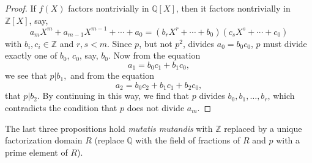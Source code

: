 \documentclass[a4paper,11pt,final,openany]{memoir}
\theoremstyle{nonumberplain}
\newtheorem{proof}{Proof.}
\begin{document}
\begin{proof}
If $f(X)$ factors nontrivially in $\mathbb{Q}[X]$, then it factors
nontrivially in $\mathbb{Z}[X]$, say,
\[
a_{m}X^{m}+a_{m-1}X^{m-1}+\cdots+a_{0}=(b_{r}X^{r}+\cdots+b_{0})(c_{s}%
X^{s}+\cdots+c_{0})
\]
with $b_{i},c_{i}\in\mathbb{Z}$ and $r,s<m$. Since $p$, but not $p^{2}$,
divides $a_{0}=b_{0}c_{0}$, $p$ must divide exactly one of $b_{0}$, $c_{0}$,
say, $b_{0}$. Now from the equation
\[
a_{1}=b_{0}c_{1}+b_{1}c_{0},
\]
we see that $p|b_{1},$ and from the equation
\[
a_{2}=b_{0}c_{2}+b_{1}c_{1}+b_{2}c_{0},
\]
that $p|b_{2}$. By continuing in this way, we find that $p$ divides
$b_{0},b_{1},\ldots,b_{r}$, which contradicts the condition that $p$ does not
divide $a_{m}$.
\end{proof}

The last three propositions hold \textit{mutatis mutandis} with $\mathbb{Z}$
replaced by a unique factorization domain $R$ (replace $\mathbb{Q}{}$ with the
field of fractions of $R$ and $p$ with a prime element of $R$).
\end{document}
